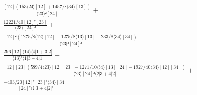 \documentclass[varwidth, border=5pt]{standalone}
\begin{document}
\begin{my}
$\begin{gathered}
\scriptscriptstyle\frac{[12](153⟨24⟩[12]+1457/8⟨34⟩[13])}{⟨23⟩²[24]} +\\
\scriptscriptstyle\frac{12221/40[12]²[23]}{⟨23⟩[24]²} +\\
\scriptscriptstyle\frac{[12]²(1275/8⟨12⟩[12]+1275/8⟨13⟩[13]-233/8⟨34⟩[34])}{⟨23⟩²[24]²} +\\
\scriptscriptstyle\frac{296[12]⟨14⟩⟨4|1+3|2]}{⟨13⟩²⟨1|3+4|1]} +\\
\scriptscriptstyle\frac{[12][23](589/4⟨23⟩[12][23]-1271/10⟨34⟩[13][24]-1927/40⟨34⟩[12][34])}{⟨23⟩[24]²⟨2|3+4|2]} +\\
\scriptscriptstyle\frac{-403/20[12]²[23]²⟨34⟩[34]}{[24]²⟨2|3+4|2]²} \phantom{+}
\end{gathered}$
\end{my}
\end{document}
